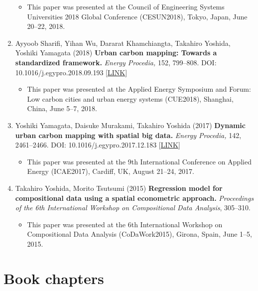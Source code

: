 \documentclass[
]{book}
\providecommand{\tightlist}{%
  \setlength{\itemsep}{0pt}\setlength{\parskip}{0pt}}
\begin{document}
\begin{enumerate}
  \begin{itemize}
  \tightlist
  \item
    This paper was presented at the Council of Engineering Systems Universities 2018 Global Conference (CESUN2018), Tokyo, Japan, June 20--22, 2018.
  \end{itemize}
\item
  Ayyoob Sharifi, Yihan Wu, Dararat Khamchiangta, Takahiro Yoshida, Yoshiki Yamagata (2018)
  \textbf{Urban carbon mapping: Towards a standardized framework.}
  \emph{Energy Procedia,} 152, 799--808.
  DOI: 10.1016/j.egypro.2018.09.193 {[}\href{https://www.sciencedirect.com/science/article/pii/S1876610218307379}{LINK}{]}

  \begin{itemize}
  \tightlist
  \item
    This paper was presented at the Applied Energy Symposium and Forum: Low carbon cities and urban energy systems (CUE2018), Shanghai, China, June 5--7, 2018.
  \end{itemize}
\item
  Yoshiki Yamagata, Daisuke Murakami, Takahiro Yoshida (2017)
  \textbf{Dynamic urban carbon mapping with spatial big data.}
  \emph{Energy Procedia,} 142, 2461--2466.
  DOI: 10.1016/j.egypro.2017.12.183 {[}\href{https://www.sciencedirect.com/science/article/pii/S1876610217359131}{LINK}{]}

  \begin{itemize}
  \tightlist
  \item
    This paper was presented at the 9th International Conference on Applied Energy (ICAE2017), Cardiff, UK, August 21--24, 2017.
  \end{itemize}
\item
  Takahiro Yoshida, Morito Tsutsumi (2015)
  \textbf{Regression model for compositional data using a spatial econometric approach.}
  \emph{Proceedings of the 6th International Workshop on Compositional Data Analysis}, 305--310.

  \begin{itemize}
  \tightlist
  \item
    This paper was presented at the 6th International Workshop on Compositional Data Analysis (CoDaWork2015), Girona, Spain, June 1--5, 2015.
  \end{itemize}
\end{enumerate}

\hypertarget{book-chapters}{%
\section*{Book chapters}\label{book-chapters}}
\end{document}
